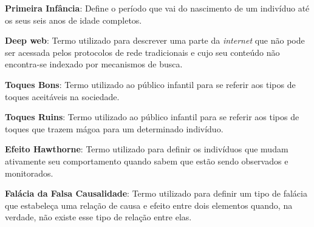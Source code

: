 {\textbf{Primeira Infância}: Define o período que vai do nascimento de um indivíduo até os seus seis anos de idade completos.

\textbf{Deep web}: Termo utilizado para descrever uma parte da \textit{internet} que não pode ser acessada pelos protocolos de rede tradicionais e cujo seu conteúdo não encontra-se indexado por mecanismos de busca. 


\textbf{Toques Bons}: Termo utilizado ao público infantil para se referir aos tipos de toques aceitáveis na sociedade. 

\textbf{Toques Ruins}: Termo utilizado ao público infantil para se referir aos tipos de toques que trazem mágoa para um determinado indivíduo. 

\textbf{Efeito Hawthorne}: Termo utilizado para definir os indivíduos que mudam ativamente seu comportamento quando sabem que estão sendo observados e monitorados.

\textbf{Falácia da Falsa Causalidade}: Termo utilizado para definir um tipo de falácia que estabeleça uma relação de causa e efeito entre dois elementos quando, na verdade, não existe esse tipo de relação entre elas.



} %


